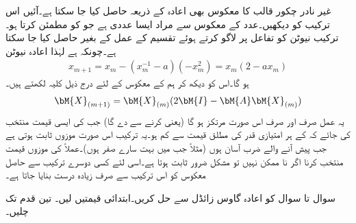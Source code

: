 غیر نادر چکور قالب کا معکوس بھی اعادہ کے ذریعہ حاصل کیا جا سکتا ہے۔آئیں اس ترکیب کو دیکھیں۔عدد  کے معکوس  سے مراد ایسا عددی ہے جو  کو مطمئن کرتا ہو۔ترکیب نیوٹن کو تفاعل  پر لاگو کرتے ہوئے تقسیم کے عمل کے بغیر  حاصل کیا جا سکتا ہے۔چونکہ  ہے لہٰذا اعادہ نیوٹن
\begin{align*}
x_{m+1}=x_m-(x_m^{-1}-a)(-x_m^2)=x_m(2-ax_m)
\end{align*}
ہو گا۔اس کو دیکھ کر ہم  کے معکوس  کے لئے درج ذیل کلیہ لکھتے ہیں۔
\begin{align}\label{مساوات_خطی_اعدادی_مثال_ج}
\bM{X}_{(m+1)}=\bM{X}_{(m)}(2\bM{I}-\bM{A}\bM{X}_{(m)})
\end{align}
یہ عمل صرف اور صرف اس صورت مرتکز ہو گا (یعنی  کرنے سے  دے گا) جب  کی ایسی قیمت منتخب کی جائے کہ  کے ہر امتیازی قدر  کی مطلق قیمت  سے کم ہو۔یہ ترکیب اس صورت موزوں ثابت ہوتی ہے جب پیش آنے والے ضرب آسان ہوں (مثلاً جب  میں بہت سارے صفر ہوں)۔عملاً   کی موزوں قیمت منتخب کرنا اگر نا ممکن نہیں تو مشکل ضرور  ثابت ہوتا ہے۔اسی لئے کسی دوسرے ترکیب سے حاصل معکوس کو اس ترکیب سے صرف زیادہ درست بنایا جاتا ہے۔ 

سوال  تا سوال  کو اعادہ گاوس زائڈل سے حل کریں۔ابتدائی قیمتیں  لیں۔ تین قدم تک چلیں۔

